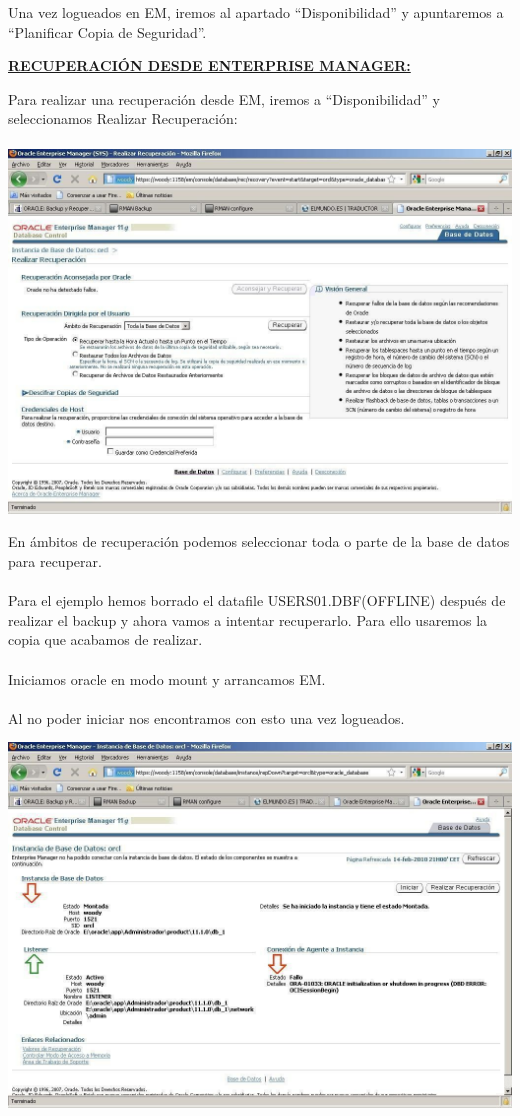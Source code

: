 \documentclass[12pt,letterpaper]{article}
\begin{document}
Una vez logueados en EM, iremos al apartado “Disponibilidad” y apuntaremos a
“Planificar Copia de Seguridad”.

\begin{enumerate}
\bf\underline{RECUPERACIÓN  DESDE  ENTERPRISE  MANAGER:}
\end{enumerate}
Para realizar una recuperación desde EM, iremos a “Disponibilidad” y seleccionamos Realizar Recuperación: \\
\\
\includegraphics[width=14cm]{./IMG/img40.jpg}

En ámbitos de recuperación podemos seleccionar toda o parte de la base de datos para recuperar. \\
\\
Para  el  ejemplo  hemos  borrado  el  datafile  USERS01.DBF(OFFLINE)  después  de realizar el backup y ahora vamos a intentar recuperarlo. Para ello usaremos la copia que acabamos de realizar. \\
\\
Iniciamos oracle en modo mount y arrancamos EM. \\
\\
Al no poder iniciar nos encontramos con esto una vez logueados.

\includegraphics[width=14cm]{./IMG/img41.jpg}
\end{document}
